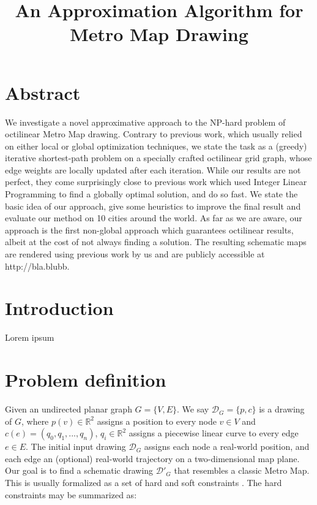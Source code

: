 \documentclass{sig-alternate-sigmod09}
\begin{document}
\title{An Approximation Algorithm for Metro Map Drawing}


\maketitle

\section{Abstract}

We investigate a novel approximative approach to the NP-hard problem of octilinear Metro Map drawing. Contrary to previous work, which usually relied on either local or global optimization techniques, we state the task as a (greedy) iterative shortest-path problem on a specially crafted octilinear grid graph, whose edge weights are locally updated after each iteration. While our results are not perfect, they come surprisingly close to previous work which used Integer Linear Programming to find a globally optimal solution, and do so fast. We state the basic idea of our approach, give some heuristics to improve the final result and evaluate our method on 10 cities around the world. As far as we are aware, our approach is the first non-global approach which guarantees octilinear results, albeit at the cost of not always finding a solution. The resulting schematic maps are rendered using previous work by us and are publicly accessible at http://bla.blubb.

\section{Introduction}

Lorem ipsum

\section{Problem definition}

Given an undirected planar graph $G = \{V, E\}$. We say $\mathcal{D}_G = \{p, c\}$ is a drawing of $G$, where $p(v) \in \mathbb{R}^2$ assigns a position to every node $v \in V$ and $c(e) = (q_0, q_1, ..., q_n)$, $q_i \in \mathbb{R}^2$ assigns a piecewise linear curve to every edge $e \in E$. The initial input drawing $\mathcal{D}_G$ assigns each node a real-world position, and each edge an (optional) real-world trajectory on a two-dimensional map plane. Our goal is to find a schematic drawing $\mathcal{D}'_G$ that resembles a classic Metro Map. This is usually formalized as a set of hard and soft constraints \cite{nb, ...}. The hard constraints may be summarized as:
\end{document}
